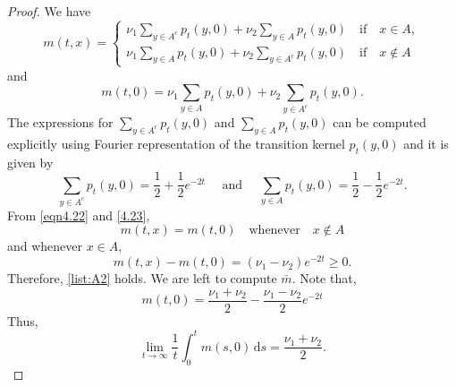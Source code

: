 \documentclass{article}[12pt]
\theoremstyle{definition}
\newcommand{\1}{\mathbbm{1}}
\newcommand{\dd }{\mathrm{d} }
\begin{document}
\begin{proof}
We have
  \begin{equation}
    m(t,x) = \left\{\begin{array}{l}
      \nu_1 \sum_{{y \in A^c} } p_t(y,0) +
      \nu_2 \sum_{y \in A } p_t(y,0) \quad
      \text{if} \quad x \in A,\\
      \nu_1 \sum_{y \in A } p_t(y,0)+ \nu_2
      \sum_{{y \in A^c} } p_t(y,0)\quad
      \text{if} \quad x \not\in A
    \end{array}\right.
    \label{eqn4.22}
  \end{equation}
  and
  \begin{equation}
    m(t,0) =
    \nu_1 \sum_{y \in A } p_t(y,0)+ \nu_2
    \sum_{{y \in A^c} } p_t(y,0).
    \label{4.23}
  \end{equation}
  The expressions for $\sum_{{y \in A^c} } p_t(y,0)$ and $\sum_{{y \in A } } p_t(y,0)$ can
  be computed explicitly using Fourier representation of the transition kernel $p_t(y,0)$ and it is given by
  \begin{equation}
      \sum_{{y \in A^c} } p_t(y,0) = \frac{1}{2}+ \frac{1}{2}e^{-2t} \quad \text{ and }\quad 
      \sum_{{y \in A} } p_t(y,0) = \frac{1}{2}- \frac{1}{2}e^{-2t}.
      \label{eqn:partition}
  \end{equation}
  From \eqref{eqn4.22} and \eqref{4.23},
  \[ m(t,x) = m(t,0) \quad \text{whenever} \quad x \not\in A \]
  and whenever $x \in A$,
  \[ m(t,x) - m(t,0) = (\nu_1 - \nu_2)e^{-2t} \geq 0. \]
  Therefore, \ref{list:A2} holds. We are left to compute $\bar m$. Note that,
\begin{equation}
    m(t,0) =
    \frac{\nu_1 + \nu_2}{2} - \frac{\nu_1-\nu_2}{2}e^{-2t}
    \label{eqn:mt0}
  \end{equation}
  Thus, 
  $$\lim_{t\to\infty}\frac{1}{t}\int_0^t m(s,0)\, \dd s = \frac{\nu_1+\nu_2}{2}.$$
  \end{proof}
\end{document}
